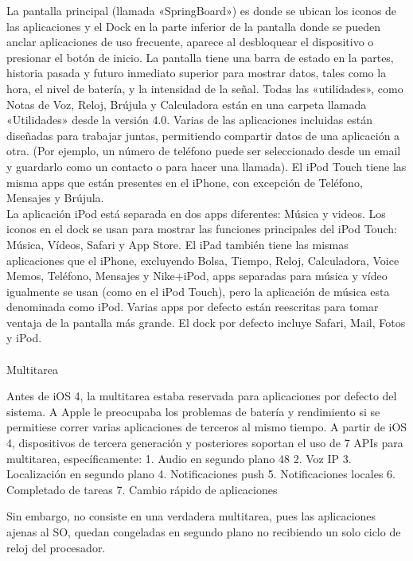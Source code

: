 	La pantalla principal (llamada «SpringBoard») es donde se ubican los iconos de las aplicaciones y el Dock en la parte inferior de la pantalla donde se pueden anclar aplicaciones de uso frecuente, aparece al desbloquear el dispositivo o presionar el botón de inicio. La pantalla tiene una barra de estado en la partes, historia pasada y futuro inmediato superior para mostrar datos, tales como la hora, el nivel de batería, y la intensidad de la señal. Todas las «utilidades», como Notas de Voz, Reloj, Brújula y Calculadora están en una carpeta llamada «Utilidades» desde la versión 4.0. Varias de las aplicaciones incluidas están diseñadas para trabajar juntas, permitiendo compartir datos de una aplicación a otra. (Por ejemplo, un número de teléfono puede ser seleccionado desde un email y guardarlo como un contacto o para hacer una llamada). El iPod Touch tiene las misma apps que están presentes en el iPhone, con excepción de Teléfono, Mensajes y Brújula.\\ 
	
	La aplicación iPod está separada en dos apps diferentes: Música y videos. Los iconos en el dock se usan para mostrar las funciones principales del iPod Touch: Música, Vídeos, Safari y App Store. El iPad también tiene las mismas aplicaciones que el iPhone, excluyendo Bolsa, Tiempo, Reloj, Calculadora, Voice Memos, Teléfono, Mensajes y Nike+iPod, apps separadas para música y vídeo igualmente se usan (como en el iPod Touch), pero la aplicación de música esta denominada como iPod. Varias apps por defecto están reescritas para tomar ventaja de la pantalla más grande. El dock por defecto incluye Safari, Mail, Fotos y iPod.\\ \\
	Multitarea 
	
	Antes de iOS 4, la multitarea estaba reservada para aplicaciones por defecto del sistema. A Apple le preocupaba los problemas de batería y rendimiento si se permitiese correr varias aplicaciones de terceros al mismo tiempo. A partir de iOS 4, dispositivos de tercera generación y posteriores soportan el uso de 7 APIs para multitarea, específicamente:
	1. Audio en segundo plano 48
	2. Voz IP
	3. Localización en segundo plano
	4. Notificaciones push
	5. Notificaciones locales
	6. Completado de tareas
	7. Cambio rápido de aplicaciones
	
	Sin embargo, no consiste en una verdadera multitarea, pues las aplicaciones ajenas al SO, quedan congeladas en segundo plano no recibiendo un solo ciclo de reloj del procesador. \cite{14}
	
